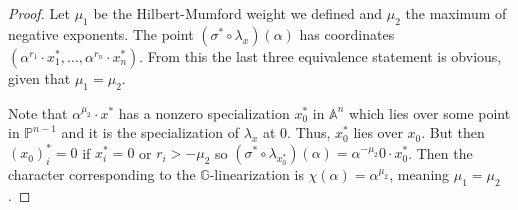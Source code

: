 \documentclass[12pt]{article}
\theoremstyle{remark}
\theoremstyle{definition}
\newcommand{\s}[0]{\sigma}
\newcommand{\A}[0]{\mathbb{A}}
\newcommand{\G}[0]{\mathbb{G}}
\begin{document}
    \begin{proof}
        Let $\mu_1$ be the Hilbert-Mumford weight we defined and $\mu_2$ the maximum of negative exponents. The point $(\s^*\circ\lambda_x)(\alpha)$ has coordinates $(\alpha^{r_1}\cdot x_1^*,\dots, \alpha^{r_n}\cdot x_n^*)$. From this the last three equivalence statement is obvious, given that $\mu_1=\mu_2$.

        Note that $\alpha^{\mu_2}\cdot x^*$ has a nonzero specialization $x_0^*$ in $\A^n$ which lies over some point in $\mathbb P^{n-1}$ and it is the specialization of $\lambda_x$ at $0$. Thus, $x_0^*$ lies over $x_0$. But then $(x_0)_i^*=0$ if $x_i^*=0$ or $r_i>-\mu_2$ so $(\s^*\circ\lambda_{x_0^*})(\alpha)=\alpha^{-\mu_2}0\cdot x_0^*$. Then the character corresponding to the $\G$-linearization is $\chi(\alpha)=\alpha^{\mu_2}$, meaning $\mu_1=\mu_2$.
    \end{proof}
\end{document}
